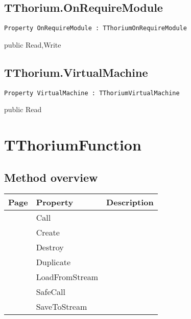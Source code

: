\subsection{TThorium.OnRequireModule}
\label{thoriumcore:thorium:tthorium:onrequiremodule}
\begin{FPCList}
\Synopsis
\Declaration 

\begin{verbatim}
Property OnRequireModule : TThoriumOnRequireModule
\end{verbatim}
\Visibility
public
\Access
Read,Write
\Description
\end{FPCList}
\subsection{TThorium.VirtualMachine}
\label{thoriumcore:thorium:tthorium:virtualmachine}
\begin{FPCList}
\Synopsis
\Declaration 

\begin{verbatim}
Property VirtualMachine : TThoriumVirtualMachine
\end{verbatim}
\Visibility
public
\Access
Read
\Description
\end{FPCList}
\section{TThoriumFunction}
\label{thoriumcore:thorium:tthoriumfunction}
\subsection{Method overview}
\label{thoriumcore:thorium:tthoriumfunction:methods}
\begin{tabularx}{\textwidth}{llX}
Page & Property & Description  \\ \hline
\pageref{thoriumcore:thorium:tthoriumfunction:call} & Call  &  \\
\pageref{thoriumcore:thorium:tthoriumfunction:create} & Create  &  \\
\pageref{thoriumcore:thorium:tthoriumfunction:destroy} & Destroy  &  \\
\pageref{thoriumcore:thorium:tthoriumfunction:duplicate} & Duplicate  &  \\
\pageref{thoriumcore:thorium:tthoriumfunction:loadfromstream} & LoadFromStream  &  \\
\pageref{thoriumcore:thorium:tthoriumfunction:safecall} & SafeCall  &  \\
\pageref{thoriumcore:thorium:tthoriumfunction:savetostream} & SaveToStream  &  \\
\hline
\end{tabularx}
